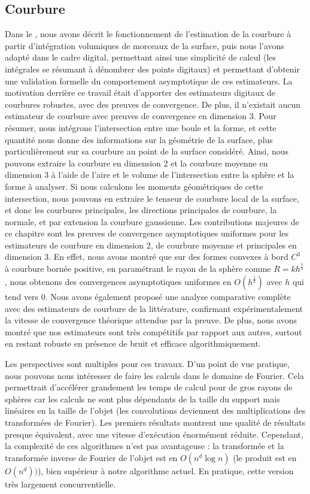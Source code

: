 \subsection*{Courbure}
%
Dans le , nous avons décrit le fonctionnement de
l'estimation de la courbure à partir d'intégration volumiques de morceaux de la
surface, puis nous l'avons adapté dans le cadre digital, permettant ainsi une
simplicité de calcul (les intégrales se résumant à dénombrer des points
digitaux) et permettant d'obtenir une validation formelle du comportement
asymptotique de ces estimateurs. La motivation derrière ce travail était
d'apporter des estimateurs digitaux de courbures robustes, avec des preuves de
convergence. De plus, il n'existait aucun estimateur de courbure avec preuves de
convergence en dimension 3.
%
Pour résumer, nous intégrons l'intersection entre une boule et la forme, et
cette quantité nous donne des informations sur la géométrie de la surface, plus
particulièrement sur sa courbure au point de la surface considéré. Ainsi, nous
pouvons extraire la courbure en dimension 2 et la courbure moyenne en dimension
3 à l'aide de \respp l'aire et le volume de l'intersection entre la sphère et la
forme à analyser. Si nous calculons les moments géométriques de cette
intersection, nous pouvons en extraire le tenseur de courbure local de la
surface, et donc les courbures principales, les directions principales de
courbure, la normale, et par extension la courbure gaussienne.
%
Les contributions majeures de ce chapitre sont les preuves de convergence
asymptotiques uniformes pour les estimateurs de courbure en dimension 2, de
courbure moyenne et principales en dimension 3. En effet, nous avons montré que
sur des formes convexes à bord $C^3$ à courbure bornée positive, en
paramétrant le rayon de la sphère comme $R = kh^\frac{1}{3}$, nous obtenons des
convergences asymptotiques uniformes en $O(h^\frac{1}{3})$ avec $h$ qui tend
vers $0$.
%
Nous avons également proposé une analyse comparative complète avec des
estimateurs de courbure de la littérature, confirmant expérimentalement la
vitesse de convergence théorique attendue par la preuve. De plus, nous avons
montré que nos estimateurs sont très compétitifs par rapport aux autres, surtout
en restant robuste en présence de bruit et efficace algorithmiquement.


Les perspectives sont multiples pour ces travaux. D'un point de vue pratique,
nous pouvons nous intéresser de faire les calculs dans le domaine de Fourier.
Cela permettrait d’accélérer grandement les temps de calcul pour de gros rayons
de sphères car les calculs ne sont plus dépendants de la taille du support mais
linéaires en la taille de l'objet (les convolutions deviennent des
multiplications des transformées de Fourier). Les premiers résultats montrent
une qualité de résultats presque équivalent, avec une vitesse d'exécution
énormément réduite. Cependant, la complexité de ces algorithmes n'est pas
avantageuse : la transformée et la transformée inverse de Fourier de l'objet est
en $O(n^d \log n)$ (le produit est en $O(n^d))$), bien supérieur à notre
algorithme actuel. En pratique, cette version très largement concurrentielle.


